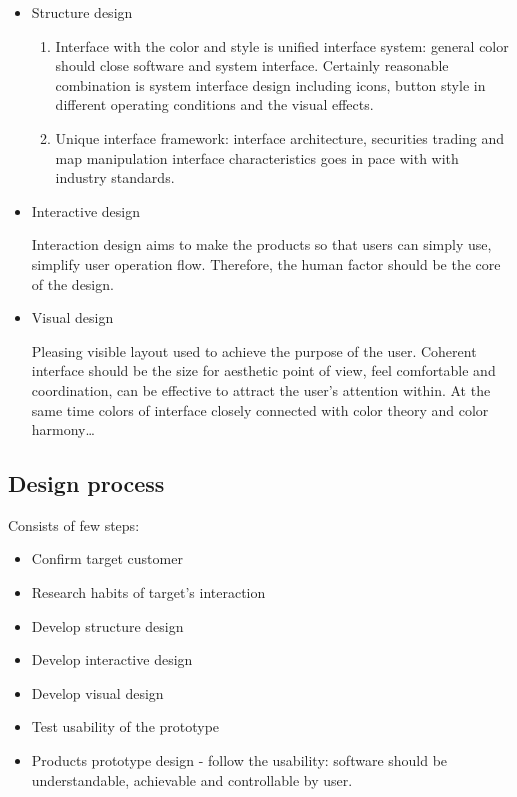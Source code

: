 \documentclass[10pt,twoside,english,a4paper]{article}
\begin{document}
\begin{itemize}
\item Structure design
\begin{enumerate}

\item Interface with the color and style is unified interface system: general color should close software and system interface. Certainly reasonable combination is system interface design including icons, button style in different operating conditions and the visual effects.
\item Unique interface framework: interface architecture, securities trading and map manipulation interface characteristics goes in pace with with industry standards.
	\end{enumerate}
\item Interactive design

Interaction design aims to make the products so that users can simply use, simplify user operation flow. Therefore, the human factor should be the core of the design.

\item Visual design

Pleasing visible layout used to achieve the purpose of the user. Coherent interface should be the size for aesthetic point of view, feel comfortable and coordination, can be effective to attract the user's attention within. At the same time colors of interface closely connected with color theory and color harmony…
\end{itemize}

\subsection{Design process}
Consists of few steps: 
\begin{itemize}
\item Confirm target customer
\item Research habits of target's interaction
\item Develop structure design
\item Develop interactive design
\item Develop visual design
\item Test usability of the prototype
\item Products prototype design - follow the usability: software should be understandable, achievable and controllable by user. \cite{5681254}
\end{itemize}
\end{document}
